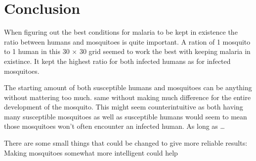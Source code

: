 \documentclass[a4paper]{report}
\begin{document}
\FloatBarrier

\section{Conclusion}
When figuring out the best conditions for malaria to be kept in existence the
ratio between humans and mosquitoes is quite important. A ration of 1 mosquito
to 1 human in this 30 $\times$ 30 grid seemed to work the best with keeping
malaria in existince. It kept the highest ratio for both infected humans as for
infected mosquitoes.

The starting amount of both susceptible humans and mosquitoes can be anything
without mattering too much. 
same without making much difference for the entire development of the mosquito.
This might seem counterintuitive as both having many susceptible mosquitoes as
well as susceptible humans would seem to mean those mosquitoes won't often
encounter an infected human. As long as \dots

There are some small things that could be changed to give more reliable results:
Making mosquitoes somewhat more intelligent could help

\end{document}
